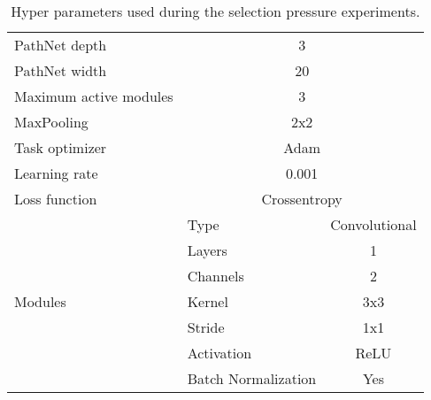 \begin{table}[ht]
\centering
\begin{tabular}{llc}
PathNet depth            & \multicolumn{2}{c}{3}               \\
PathNet width            & \multicolumn{2}{c}{20}              \\
Maximum active modules   & \multicolumn{2}{c}{3}               \\
MaxPooling               & \multicolumn{2}{c}{2x2}             \\
Task optimizer           & \multicolumn{2}{c}{Adam}            \\
Learning rate            & \multicolumn{2}{c}{0.001}           \\
Loss function            & \multicolumn{2}{c}{Crossentropy}    \\
\multirow{7}{*}{Modules} & Type                & Convolutional \\
                         & Layers              & 1             \\
                         & Channels            & 2             \\
                         & Kernel              & 3x3           \\
                         & Stride              & 1x1           \\
                         & Activation          & ReLU          \\
                         & Batch Normalization & Yes           \\
\end{tabular}
\caption[Selection pressure experiment hyper-parameters]{Hyper parameters used during the selection pressure experiments.}
\label{tab:exp2.hyperparams}
\end{table}
